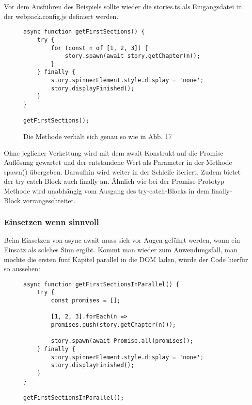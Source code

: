 \noindent
Vor dem Ausführen des Beispiels sollte wieder die stories.ts als Eingangsdatei in der webpack.config.js definiert werden.

\begin{figure}[H]
\begin{lstlisting}[basicstyle=\small]
async function getFirstSections() {
    try {
        for (const n of [1, 2, 3]) {
            story.spawn(await story.getChapter(n));
        }
    } finally {
        story.spinnerElement.style.display = 'none';
        story.displayFinished();
    }
}

getFirstSections();
\end{lstlisting}
\caption{Die Methode verhält sich genau so wie in Abb. 17}
\end{figure}

\noindent
Ohne jeglicher Verkettung wird mit dem await Konstrukt auf die Promise Auflösung gewartet und der entstandene Wert als Parameter in der Methode spawn() übergeben. Daraufhin wird weiter in der Schleife iteriert. Zudem bietet der try-catch-Block auch finally an. Ähnlich wie bei der Promise-Prototyp Methode wird unabhängig vom Ausgang des try-catch-Blocks in dem finally-Block vorrangeschreitet.

\subsubsection{Einsetzen wenn sinnvoll}

Beim Einsetzen von async await muss sich vor Augen geführt werden, wann ein Einsatz als solches Sinn ergibt. Kommt man wieder zum Anwendungsfall, man möchte die ersten fünf Kapitel parallel in die DOM laden, würde der Code hierfür so aussehen:

\begin{figure}[H]
\begin{lstlisting}[basicstyle=\small]
async function getFirstSectionsInParallel() {
    try {
        const promises = [];

        [1, 2, 3].forEach(n => 
        promises.push(story.getChapter(n)));

        story.spawn(await Promise.all(promises));
    } finally {
        story.spinnerElement.style.display = 'none';
        story.displayFinished();
    }
}

getFirstSectionsInParallel();
\end{lstlisting}
\end{figure}

